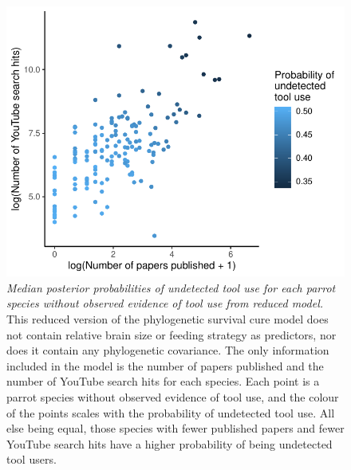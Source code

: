\documentclass[
  man,floatsintext]{apa6}
\begin{document}
\begin{figure}
\centering
\includegraphics{manuscript_files/figure-latex/plotSurvCure3-1.pdf}
\caption{\label{fig:plotSurvCure3}\emph{Median posterior probabilities of undetected tool use for each parrot species without observed evidence of tool use from reduced model.} This reduced version of the phylogenetic survival cure model does not contain relative brain size or feeding strategy as predictors, nor does it contain any phylogenetic covariance. The only information included in the model is the number of papers published and the number of YouTube search hits for each species. Each point is a parrot species without observed evidence of tool use, and the colour of the points scales with the probability of undetected tool use. All else being equal, those species with fewer published papers and fewer YouTube search hits have a higher probability of being undetected tool users.}
\end{figure}

\newpage
\end{document}
